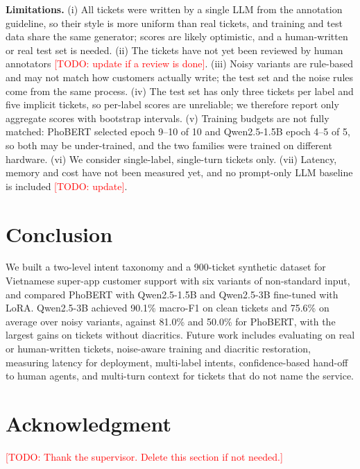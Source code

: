 \documentclass[conference]{IEEEtran}
\newcommand{\TODO}[1]{\textcolor{red}{[TODO: #1]}}
\begin{document}
\textbf{Limitations.} (i) All tickets were written by a single LLM from
the annotation guideline, so their style is more uniform than real tickets,
and training and test data share the same generator; scores are likely
optimistic, and a human-written or real test set is needed. (ii) The tickets
have not yet been reviewed by human annotators \TODO{update if a review is
done}. (iii) Noisy variants are rule-based and may not match how customers
actually write; the test set and the noise rules come from the same
process. (iv) The test set has only three tickets per label and five
implicit tickets, so per-label scores are unreliable; we therefore report
only aggregate scores with bootstrap intervals. (v) Training budgets are not
fully matched: PhoBERT selected epoch 9--10 of 10 and Qwen2.5-1.5B epoch
4--5 of 5, so both may be under-trained, and the two families were trained
on different hardware. (vi) We consider single-label, single-turn tickets
only. (vii) Latency, memory and cost have not been measured yet, and no
prompt-only LLM baseline is included \TODO{update}.

\section{Conclusion}
\label{sec:conclusion}
We built a two-level intent taxonomy and a 900-ticket synthetic dataset for
Vietnamese super-app customer support with six variants of non-standard
input, and compared PhoBERT with Qwen2.5-1.5B and Qwen2.5-3B fine-tuned with
LoRA. Qwen2.5-3B achieved 90.1\% macro-F1 on clean tickets and 75.6\% on
average over noisy variants, against 81.0\% and 50.0\% for PhoBERT, with the
largest gains on tickets without diacritics. Future work includes
evaluating on real or human-written tickets, noise-aware training and
diacritic restoration, measuring latency for deployment, multi-label
intents, confidence-based hand-off to human agents, and multi-turn context
for tickets that do not name the service.

\section*{Acknowledgment}
\TODO{Thank the supervisor. Delete this section if not needed.}



\end{document}
